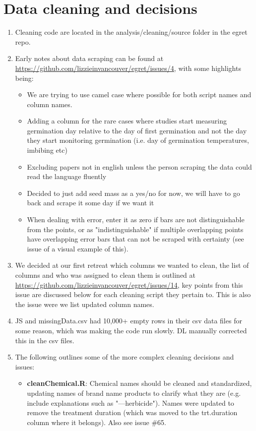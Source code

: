 \documentclass{article}[12pt]
\begin{document}
\section*{Data cleaning and decisions}
\begin{enumerate}
\item Cleaning code are located in the analysis/cleaning/source folder in the egret repo.
\item Early notes about data scraping can be found at \url{https://github.com/lizzieinvancouver/egret/issues/4}, with some highlights being:
\begin{itemize}
\item We are trying to use camel case where possible for both script names and column names. 
\item Adding a column for the rare cases where studies start measuring germination day relative to the day of first germination and not the day they start monitoring germination (i.e. day of germination temperatures, imbibing etc)
\item Excluding papers not in english unless the person scraping the data could read the language fluently %
\item Decided to just add seed mass as a yes/no for now, we will have to go back and scrape it some day if we want it
\item When dealing with error, enter it as zero if bars are not distinguishable from the points, or as "indistinguishable" if multiple overlapping points have overlapping error bars that can not be scraped with certainty (see issue of a visual example of this).
\end{itemize}
\item We decided at our first retreat which columns we wanted to clean, the list of columns and who was assigned to clean them is outlined at \url{https://github.com/lizzieinvancouver/egret/issues/14}, key points from this issue are discussed below for each cleaning script they pertain to. This is also the issue were we list updated column names.
\item JS and missingData.csv had 10,000+ empty rows in their csv data files for some reason, which was making the code run slowly. DL manually corrected this in the csv files.
\item The following outlines some of the more complex cleaning decisions and issues:
\begin{itemize}
\item \textbf{cleanChemical.R}: Chemical names should be cleaned and standardized, updating names of brand name products to clarify what they are (e.g. include explanations such as "---herbicide"). Names were updated to remove the treatment duration (which was moved to the trt.duration column where it belongs). Also see issue \#65.

\end{itemize}
\end{enumerate}
\end{document}
